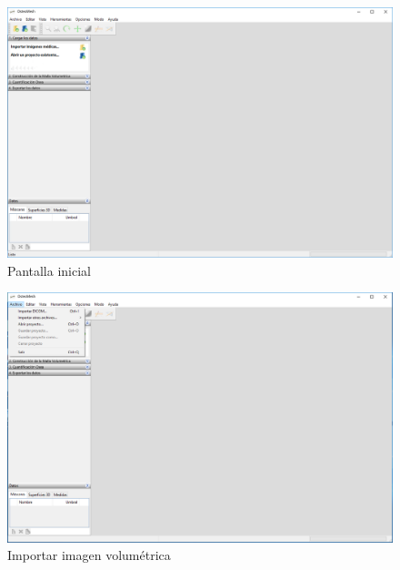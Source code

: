 \documentclass{article}
\begin{document}
\begin{figure}[!ht]
	\includegraphics[width=\textwidth]{images/handling/1}
	\caption{Pantalla inicial}
	\label{fig:handling:1}
\end{figure}

\begin{figure}[!ht]
	\includegraphics[width=\textwidth]{images/handling/2}
	\caption{Importar imagen volumétrica}
	\label{fig:handling:2}
\end{figure}
\end{document}
